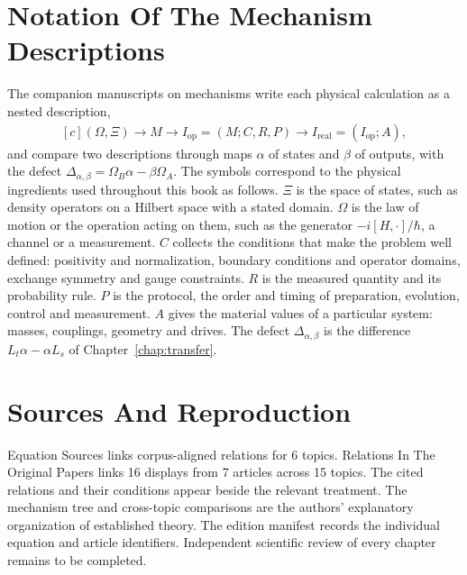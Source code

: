 \documentclass[11pt,oneside]{book}
\newenvironment{centeredalign}{\[\begin{gathered}[c]}{\end{gathered}\]}
\begin{document}
\backmatter


\chapter{Notation Of The Mechanism Descriptions}\label{chap:notation}
The companion manuscripts on mechanisms write each physical calculation as a nested description,
\begin{centeredalign}
(\Omega,\Xi)\longrightarrow M\longrightarrow I_{\mathrm{op}}=(M;C,R,P)\longrightarrow I_{\mathrm{real}}=(I_{\mathrm{op}};A),
\end{centeredalign}
and compare two descriptions through maps \(\alpha\) of states and \(\beta\) of outputs, with the defect
\(\Delta_{\alpha,\beta}=\Omega_B\alpha-\beta\Omega_A\). The symbols correspond to the physical ingredients used throughout
this book as follows. \(\Xi\) is the space of states, such as density operators on a Hilbert space with a stated domain.
\(\Omega\) is the law of motion or the operation acting on them, such as the generator \(-i[H,\cdot]/\hbar\), a channel or
a measurement. \(C\) collects the conditions that make the problem well defined: positivity and normalization, boundary
conditions and operator domains, exchange symmetry and gauge constraints. \(R\) is the measured quantity and its
probability rule. \(P\) is the protocol, the order and timing of preparation, evolution, control and measurement. \(A\)
gives the material values of a particular system: masses, couplings, geometry and drives. The defect
\(\Delta_{\alpha,\beta}\) is the difference \(L_t\alpha-\alpha L_s\) of Chapter~\ref{chap:transfer}.


\chapter{Sources And Reproduction}

Equation Sources links corpus-aligned relations for 6 topics. Relations In The Original Papers links 16 displays from 7 articles across 15 topics. The cited relations and their conditions appear beside the relevant treatment. The mechanism tree and cross-topic comparisons are the authors' explanatory organization of established theory. The edition manifest records the individual equation and article identifiers. Independent scientific review of every chapter remains to be completed.
\end{document}
